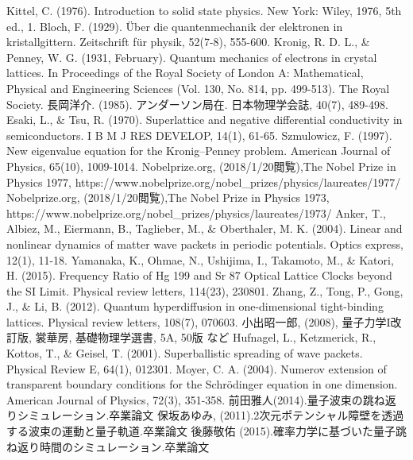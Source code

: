 \documentclass[a4paper, lualatex]{bxjsarticle}
\begin{document}
\begin{thebibliography}{30}
    Kittel, C. (1976). Introduction to solid state physics. New York: Wiley, 1976, 5th ed., 1.
    Bloch, F. (1929). Über die quantenmechanik der elektronen in kristallgittern. Zeitschrift für physik, 52(7-8), 555-600.
    Kronig, R. D. L., \& Penney, W. G. (1931, February). Quantum mechanics of electrons in crystal lattices. In Proceedings of the Royal Society of London A: Mathematical, Physical and Engineering Sciences (Vol. 130, No. 814, pp. 499-513). The Royal Society.
    長岡洋介. (1985). アンダーソン局在. 日本物理学会誌, 40(7), 489-498.
    Esaki, L., \& Tsu, R. (1970). Superlattice and negative differential conductivity in semiconductors. I B M J RES DEVELOP, 14(1), 61-65.
    Szmulowicz, F. (1997). New eigenvalue equation for the Kronig–Penney problem. American Journal of Physics, 65(10), 1009-1014.
    Nobelprize.org, (2018/1/20閲覧),The Nobel Prize in Physics 1977, https://www.nobelprize.org/nobel\_prizes/physics/laureates/1977/
    Nobelprize.org, (2018/1/20閲覧),The Nobel Prize in Physics 1973, https://www.nobelprize.org/nobel\_prizes/physics/laureates/1973/
    Anker, T., Albiez, M., Eiermann, B., Taglieber, M., \& Oberthaler, M. K. (2004). Linear and nonlinear dynamics of matter wave packets in periodic potentials. Optics express, 12(1), 11-18.
    Yamanaka, K., Ohmae, N., Ushijima, I., Takamoto, M., \& Katori, H. (2015). Frequency Ratio of Hg 199 and Sr 87 Optical Lattice Clocks beyond the SI Limit. Physical review letters, 114(23), 230801.
    Zhang, Z., Tong, P., Gong, J., \& Li, B. (2012). Quantum hyperdiffusion in one-dimensional tight-binding lattices. Physical review letters, 108(7), 070603.
    小出昭一郎, (2008), 量子力学I改訂版, 裳華房, 基礎物理学選書, 5A, 50版 など
    Hufnagel, L., Ketzmerick, R., Kottos, T., \& Geisel, T. (2001). Superballistic spreading of wave packets. Physical Review E, 64(1), 012301.
    Moyer, C. A. (2004). Numerov extension of transparent boundary conditions for the Schrödinger equation in one dimension. American Journal of Physics, 72(3), 351-358.
    前田雅人(2014).量子波束の跳ね返りシミュレーション.卒業論文
    保坂あゆみ, (2011).2次元ポテンシャル障壁を透過する波束の運動と量子軌道.卒業論文
    後藤敬佑 (2015).確率力学に基づいた量子跳ね返り時間のシミュレーション.卒業論文

\end{thebibliography}
\end{document}
